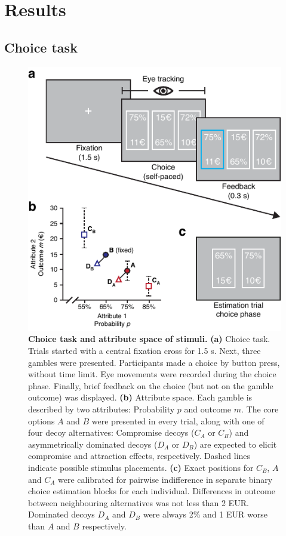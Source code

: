 \documentclass[11pt, a4paper]{article}
\begin{document}
\section*{Results}

\subsection*{Choice task}

\begin{figure}
\centering
\includegraphics[scale=1]{../figures/1-task_stimuli.pdf}
\caption{\textbf{Choice task and attribute space of stimuli.} \textbf{(a)} Choice task. Trials started with a central fixation cross for 1.5 s. Next, three gambles were presented. Participants made a choice by button press, without time limit. Eye movements were recorded during the choice phase. Finally, brief feedback on the choice (but not on the gamble outcome) was displayed. \textbf{(b)} Attribute space. Each gamble is described by two attributes: Probability $p$ and outcome $m$. The core options $A$ and $B$ were presented in every trial, along with one of four decoy alternatives: Compromise decoys ($C_A$ or $C_B$) and asymmetrically dominated decoys ($D_A$ or $D_B$) are expected to elicit compromise and attraction effects, respectively. Dashed lines indicate possible stimulus placements. \textbf{(c)} Exact positions for $C_B$, $A$ and $C_A$ were calibrated for pairwise indifference in separate binary choice estimation blocks for each individual. Differences in outcome between neighbouring alternatives was not less than 2 EUR. Dominated decoys $D_A$ and $D_B$ were always 2\% and 1 EUR worse than $A$ and $B$ respectively.}
\hspace{0.5cm}
\label{fig:task}
\end{figure}
\end{document}
